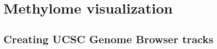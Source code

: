 \documentclass[10pt]{article}
\begin{document}







\section{Methylome visualization}
\label{sec:visualization}


\subsection{Creating UCSC Genome Browser tracks}
\label{sec:browser}
\end{document}
